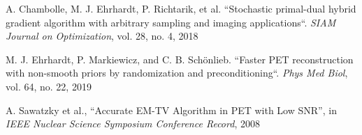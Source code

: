 \documentclass{IEEEtran}
\begin{document}
\begin{thebibliography}{00}
A. Chambolle, M. J. Ehrhardt, P. Richtarik, et al. 
``Stochastic primal-dual hybrid gradient algorithm with arbitrary sampling and imaging
applications``. 
\textit{SIAM Journal on Optimization}, vol. 28, no. 4, 2018

 M. J. Ehrhardt, P. Markiewicz, and C. B. Sch\"onlieb. 
``Faster PET reconstruction with non-smooth priors by randomization and preconditioning``. 
\textit{Phys Med Biol}, vol. 64, no. 22, 2019

 A. Sawatzky et al.,
``Accurate EM-TV Algorithm in PET with Low SNR'',
in \textit{IEEE Nuclear Science Symposium Conference Record}, 2008
\end{thebibliography}
\end{document}
